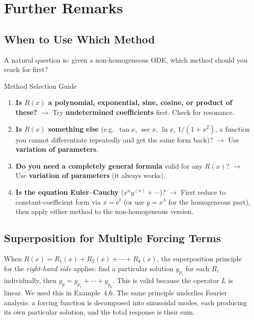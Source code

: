 \documentclass[12pt,a4paper]{article}
\newcommand{\ee}{\mathrm{e}}
\begin{document}
\section{Further Remarks}

\subsection{When to Use Which Method}

A natural question is: given a non-homogeneous ODE, which method should you reach
for first?

\begin{procedurebox}{Method Selection Guide}
\begin{enumerate}[itemsep=4pt]
  \item \textbf{Is $R(x)$ a polynomial, exponential, sine, cosine, or product of
        these?} $\to$ Try \textbf{undetermined coefficients} first. Check for resonance.
  \item \textbf{Is $R(x)$ something else} (e.g.\ $\tan x$, $\sec x$, $\ln x$,
        $1/(1+x^2)$, a function you cannot differentiate repeatedly and get the same
        form back)? $\to$ Use \textbf{variation of parameters}.
  \item \textbf{Do you need a completely general formula} valid for any $R(x)$?
        $\to$ Use \textbf{variation of parameters} (it always works).
  \item \textbf{Is the equation Euler--Cauchy} ($x^n y^{(n)} + \cdots$)?
        $\to$ First reduce to constant-coefficient form via $x = \ee^t$ (or use
        $y = x^\lambda$ for the homogeneous part), then apply either method to the
        non-homogeneous version.
\end{enumerate}
\end{procedurebox}

\subsection{Superposition for Multiple Forcing Terms}

When $R(x) = R_1(x) + R_2(x) + \cdots + R_k(x)$, the superposition principle
for the \emph{right-hand side} applies: find a particular solution $y_{p_i}$
for each $R_i$ individually, then $y_p = y_{p_1} + \cdots + y_{p_k}$. This is
valid because the operator $L$ is linear. We used this in Example~4.6. The
same principle underlies Fourier analysis: a forcing function is decomposed into
sinusoidal modes, each producing its own particular solution, and the total
response is their sum.
\end{document}
